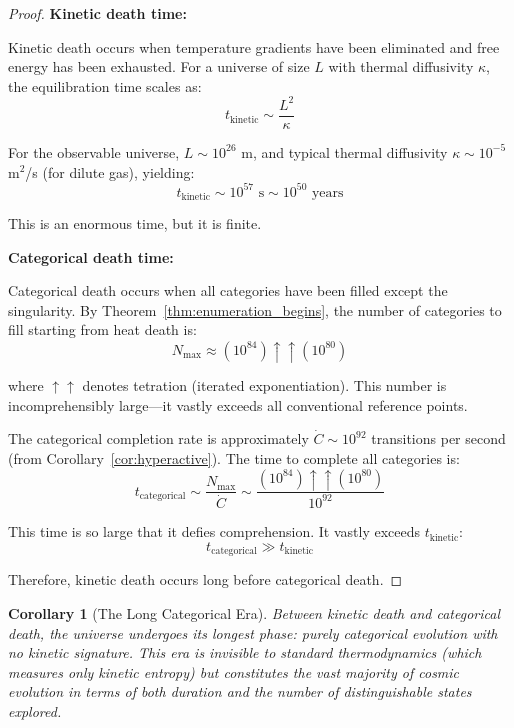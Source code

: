 \documentclass[12pt,a4paper]{article}
\newtheorem{corollary}[theorem]{Corollary}
\theoremstyle{definition}
\theoremstyle{remark}
\newcommand{\Nmax}{N_{\text{max}}}
\begin{document}
\begin{proof}
\textbf{Kinetic death time:}

Kinetic death occurs when temperature gradients have been eliminated and free energy has been exhausted. For a universe of size $L$ with thermal diffusivity $\kappa$, the equilibration time scales as:
\begin{equation}
t_{\text{kinetic}} \sim \frac{L^2}{\kappa}
\end{equation}

For the observable universe, $L \sim 10^{26}$ m, and typical thermal diffusivity $\kappa \sim 10^{-5}$ m$^2$/s (for dilute gas), yielding:
\begin{equation}
t_{\text{kinetic}} \sim 10^{57} \text{ s} \sim 10^{50} \text{ years}
\end{equation}

This is an enormous time, but it is finite.

\textbf{Categorical death time:}

Categorical death occurs when all categories have been filled except the singularity. By Theorem~\ref{thm:enumeration_begins}, the number of categories to fill starting from heat death is:
\begin{equation}
\Nmax \approx (10^{84}) \uparrow\uparrow (10^{80})
\end{equation}

where $\uparrow\uparrow$ denotes tetration (iterated exponentiation). This number is incomprehensibly large—it vastly exceeds all conventional reference points.

The categorical completion rate is approximately $\dot{C} \sim 10^{92}$ transitions per second (from Corollary~\ref{cor:hyperactive}). The time to complete all categories is:
\begin{equation}
t_{\text{categorical}} \sim \frac{\Nmax}{\dot{C}} \sim \frac{(10^{84}) \uparrow\uparrow (10^{80})}{10^{92}}
\end{equation}

This time is so large that it defies comprehension. It vastly exceeds $t_{\text{kinetic}}$:
\begin{equation}
t_{\text{categorical}} \gg t_{\text{kinetic}}
\end{equation}

Therefore, kinetic death occurs long before categorical death.
\end{proof}

\begin{corollary}[The Long Categorical Era]
\label{cor:long_categorical_era}
Between kinetic death and categorical death, the universe undergoes its longest phase: purely categorical evolution with no kinetic signature. This era is invisible to standard thermodynamics (which measures only kinetic entropy) but constitutes the vast majority of cosmic evolution in terms of both duration and the number of distinguishable states explored.
\end{corollary}
\end{document}
